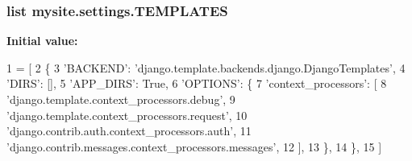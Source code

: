 \hypertarget{namespacemysite_1_1settings_a073a410822eed069da826d807a904fff}{
\subsubsection[{T\-E\-M\-P\-L\-A\-T\-E\-S}]{\setlength{\rightskip}{0pt plus 5cm}list mysite.\-settings.\-T\-E\-M\-P\-L\-A\-T\-E\-S}}\label{namespacemysite_1_1settings_a073a410822eed069da826d807a904fff}
{\bfseries Initial value\-:}
\begin{DoxyCode}
1 = [
2     \{
3         \textcolor{stringliteral}{'BACKEND'}: \textcolor{stringliteral}{'django.template.backends.django.DjangoTemplates'},
4         \textcolor{stringliteral}{'DIRS'}: [],
5         \textcolor{stringliteral}{'APP\_DIRS'}: \textcolor{keyword}{True},
6         \textcolor{stringliteral}{'OPTIONS'}: \{
7             \textcolor{stringliteral}{'context\_processors'}: [
8                 \textcolor{stringliteral}{'django.template.context\_processors.debug'},
9                 \textcolor{stringliteral}{'django.template.context\_processors.request'},
10                 \textcolor{stringliteral}{'django.contrib.auth.context\_processors.auth'},
11                 \textcolor{stringliteral}{'django.contrib.messages.context\_processors.messages'},
12             ],
13         \},
14     \},
15 ]
\end{DoxyCode}
